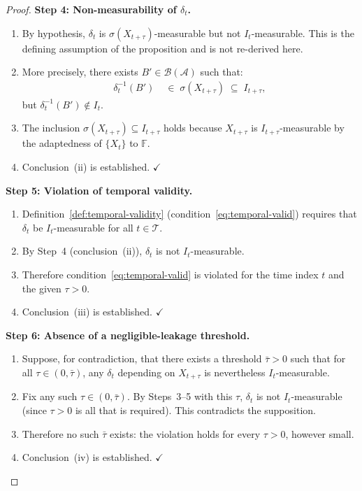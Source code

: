 \documentclass[12pt,openany]{book}
\newcommand{\calI}{\mathcal{I}}
\newcommand{\calA}{\mathcal{A}}
\numberwithin{equation}{chapter}
\theoremstyle{plain}
\theoremstyle{definition}
\theoremstyle{remark}
\numberwithin{equation}{chapter}
\theoremstyle{plain}
\def\calI{I}%
\begin{document}
\begin{proof}
\medskip
\noindent\textbf{Step 4: Non-measurability of $\delta_t$.}
\begin{enumerate}
  \item By hypothesis, $\delta_t$ is $\sigma(X_{t+\tau})$-measurable
        but not $\calI_t$-measurable.  This is the defining
        assumption of the proposition and is not re-derived here.
  \item More precisely, there exists $B' \in \mathcal{B}(\calA)$
        such that:
        \begin{align}
          \delta_t^{-1}(B')
          &\;\in\; \sigma(X_{t+\tau})
          \;\subseteq\; \calI_{t+\tau},
          \label{eq:delta-meas}
        \end{align}
        but $\delta_t^{-1}(B') \notin \calI_t$.
  \item The inclusion $\sigma(X_{t+\tau}) \subseteq \calI_{t+\tau}$
        holds because $X_{t+\tau}$ is $\calI_{t+\tau}$-measurable
        by the adaptedness of $\{X_t\}$ to $\mathbb{F}$.
  \item Conclusion~(ii) is established. $\checkmark$
\end{enumerate}

\medskip
\noindent\textbf{Step 5: Violation of temporal validity.}
\begin{enumerate}
  \item Definition~\ref{def:temporal-validity}
        (condition~\eqref{eq:temporal-valid}) requires that
        $\delta_t$ be $\calI_t$-measurable for all $t \in
        \mathcal{T}$.
  \item By Step~4 (conclusion~(ii)), $\delta_t$ is not
        $\calI_t$-measurable.
  \item Therefore condition~\eqref{eq:temporal-valid} is violated
        for the time index $t$ and the given $\tau > 0$.
  \item Conclusion~(iii) is established. $\checkmark$
\end{enumerate}

\medskip
\noindent\textbf{Step 6: Absence of a negligible-leakage threshold.}
\begin{enumerate}
  \item Suppose, for contradiction, that there exists a threshold
        $\bar{\tau} > 0$ such that for all $\tau \in (0,
        \bar{\tau})$, any $\delta_t$ depending on $X_{t+\tau}$
        is nevertheless $\calI_t$-measurable.
  \item Fix any such $\tau \in (0, \bar{\tau})$.  By Steps~3--5
        with this $\tau$, $\delta_t$ is not $\calI_t$-measurable
        (since $\tau > 0$ is all that is required).  This
        contradicts the supposition.
  \item Therefore no such $\bar{\tau}$ exists: the violation holds
        for every $\tau > 0$, however small.
  \item Conclusion~(iv) is established. $\checkmark$
\end{enumerate}


\end{proof}
\end{document}
